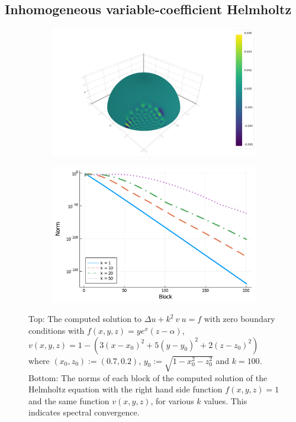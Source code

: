 \documentclass[11pt, oneside]{article}   	%
\begin{document}
\subsection{Inhomogeneous variable-coefficient Helmholtz}

\begin{figure}[tp]
	\centering
	\begin{subfigure}{0.85\textwidth}
		\includegraphics[scale=0.4]{helmholtz-f=wyexpx-N=60-n=300}
	\end{subfigure}
	
	\begin{subfigure}{0.55\textwidth}
		\includegraphics[scale=0.4]{solutionblocknorms-helmholtz-varyingk-N=200}
	\end{subfigure}
	\caption{Top: The computed solution to $\Delta u + k^2 \: v \: u = f$ with zero boundary conditions with $f(x,y,z) = y e^x (z - \alpha) $, $v(x,y,z) = 1 - (3(x-x_0)^2 + 5(y-y_0)^2 + 2(z-z_0)^2)$ where $(x_0, z_0) := (0.7, 0.2)$, $y_0 := \sqrt{1 - x_0^2 - z_0^2}$ and $k = 100$. Bottom: The norms of each block of the computed solution of the Helmholtz equation with the right hand side function $f(x,y,z) = 1$ and the same function $v(x,y,z)$, for various $k$ values. This indicates spectral convergence.}
	\label{fig:helmholtz}
\end{figure}
\end{document}
